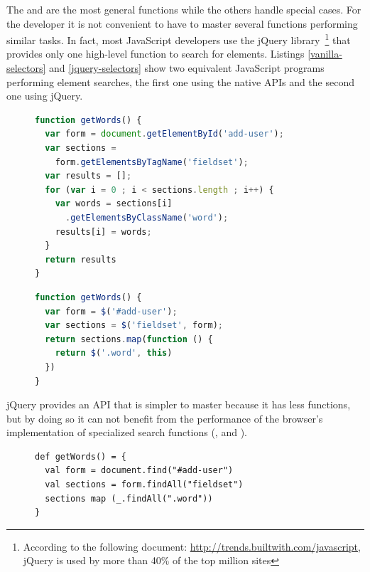 \documentclass[preprint]{sigplanconf}
\begin{document}
The  and  are the most general functions while the others handle special
cases. For the developer it is not convenient to have to master several functions performing similar tasks. In fact,
most JavaScript developers use the jQuery
library~\cite{Bibeault08_jQuery}\footnote{According to the following document:
\href{http://trends.builtwith.com/javascript}{ http://trends.builtwith.com/javascript}, jQuery is used by more than
40\% of the top million sites} that provides only one high-level function to search for elements.
Listings \ref{vanilla-selectors} and \ref{jquery-selectors} show two equivalent JavaScript programs performing
element searches, the first one using the native APIs and the second one using jQuery.

\begin{figure}
\begin{lstlisting}[language=JavaScript,label=vanilla-selectors,caption=Selectors in plain JavaScript]
function getWords() {
  var form = document.getElementById('add-user');
  var sections =
    form.getElementsByTagName('fieldset');
  var results = [];
  for (var i = 0 ; i < sections.length ; i++) {
    var words = sections[i]
      .getElementsByClassName('word');
    results[i] = words;
  }
  return results
}
\end{lstlisting}
\end{figure}

\begin{figure}
\begin{lstlisting}[language=JavaScript,label=jquery-selectors,caption=Selectors in jQuery]
function getWords() {
  var form = $('#add-user');
  var sections = $('fieldset', form);
  return sections.map(function () {
    return $('.word', this)
  })
}
\end{lstlisting}
\end{figure}

jQuery provides an API that is simpler to master because it has less functions, but by doing so it can not benefit
from the performance of the browser’s implementation of specialized search functions (,
 and ).

\begin{figure}
\begin{lstlisting}[label=js-scala-selectors,caption=Selectors in js-scala]
def getWords() = {
  val form = document.find("#add-user")
  val sections = form.findAll("fieldset")
  sections map (_.findAll(".word"))
}
\end{lstlisting}
\end{figure}
\end{document}

